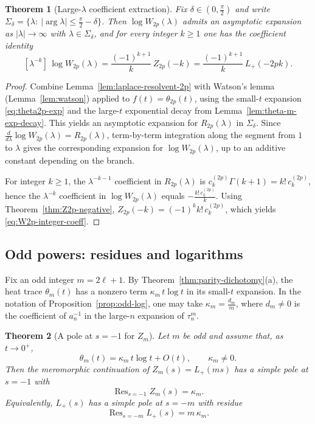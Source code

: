 \documentclass[11pt,letterpaper]{amsart}
\numberwithin{equation}{section}
\newtheorem{theorem}{Theorem}[section]
\theoremstyle{definition}
\newcommand{\Res}{\operatorname{Res}}
\begin{document}
\begin{theorem}[Large-$\lambda$ coefficient extraction]\label{thm:W2p-coeff-extraction}
Fix $\delta\in(0,\tfrac{\pi}{2})$ and write $\Sigma_\delta=\{\lambda:\ |\arg\lambda|\le \tfrac{\pi}{2}-\delta\}$.
Then $\log W_{2p}(\lambda)$ admits an asymptotic expansion as $|\lambda|\to\infty$ with $\lambda\in\Sigma_\delta$,
and for every integer $k\ge1$ one has the coefficient identity
\begin{equation}\label{eq:W2p-integer-coeff}
[\lambda^{-k}]\,\log W_{2p}(\lambda)=\frac{(-1)^{k+1}}{k}\,Z_{2p}(-k)
=\frac{(-1)^{k+1}}{k}\,L_+(-2pk).
\end{equation}
\end{theorem}

\begin{proof}
Combine Lemma~\ref{lem:laplace-resolvent-2p} with Watson’s lemma (Lemma~\ref{lem:watson})
applied to $f(t)=\theta_{2p}(t)$, using the small-$t$ expansion \eqref{eq:theta2p-exp} and the
large-$t$ exponential decay from Lemma~\ref{lem:theta-m-exp-decay}. This yields an asymptotic expansion
for $R_{2p}(\lambda)$ in $\Sigma_\delta$. Since $\frac{d}{d\lambda}\log W_{2p}(\lambda)=R_{2p}(\lambda)$,
term-by-term integration along the segment from $1$ to $\lambda$ gives the corresponding expansion for
$\log W_{2p}(\lambda)$, up to an additive constant depending on the branch.

For integer $k\ge1$, the $\lambda^{-k-1}$ coefficient in $R_{2p}(\lambda)$ is
$c^{(2p)}_k\Gamma(k+1)=k!\,c^{(2p)}_k$, hence the $\lambda^{-k}$ coefficient in $\log W_{2p}(\lambda)$ equals
$-\frac{k!\,c^{(2p)}_k}{k}$. Using Theorem~\ref{thm:Z2p-negative}, $Z_{2p}(-k)=(-1)^k k!\,c^{(2p)}_k$,
which yields \eqref{eq:W2p-integer-coeff}.
\end{proof}

\subsection{Odd powers: residues and logarithms}

Fix an odd integer $m=2\ell+1$.
By Theorem~\ref{thm:parity-dichotomy}\textup{(a)}, the heat trace $\theta_m(t)$ has a nonzero term
$\kappa_m\,t\log t$ in its small-$t$ expansion. In the notation of Proposition~\ref{prop:odd-log},
one may take $\kappa_m=\frac{d_m}{m}$, where $d_m\neq0$ is the coefficient of $a_n^{-1}$ in the
large-$n$ expansion of $\tau_n^m$.

\begin{theorem}[A pole at $s=-1$ for $Z_m$]\label{thm:Zm-odd-pole}
Let $m$ be odd and assume that, as $t\to0^+$,
\[
\theta_m(t)=\kappa_m\,t\log t + O(t),
\qquad \kappa_m\neq0.
\]
Then the meromorphic continuation of $Z_m(s)=L_+(ms)$ has a \emph{simple pole} at $s=-1$ with
\begin{equation}\label{eq:Zm-res-minus1}
\Res_{s=-1} Z_m(s)=\kappa_m.
\end{equation}
Equivalently, $L_+(s)$ has a simple pole at $s=-m$ with residue
\begin{equation}\label{eq:Lplus-res-minusm}
\Res_{s=-m} L_+(s)=m\,\kappa_m.
\end{equation}
\end{theorem}
\end{document}
